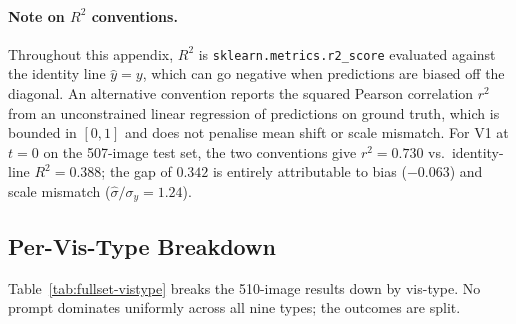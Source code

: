 \paragraph{Note on $R^2$ conventions.}
Throughout this appendix, $R^2$ is \texttt{sklearn.metrics.r2\_score}
evaluated against the identity line $\hat{y} = y$, which can go negative
when predictions are biased off the diagonal. An alternative convention
reports the squared Pearson correlation $r^2$ from an unconstrained
linear regression of predictions on ground truth, which is bounded in
$[0,1]$ and does not penalise mean shift or scale mismatch. For V1 at
$t = 0$ on the 507-image test set, the two conventions give $r^2 = 0.730$
vs.\ identity-line $R^2 = 0.388$; the gap of $0.342$ is entirely
attributable to bias ($-0.063$) and scale mismatch
($\hat\sigma / \sigma_y = 1.24$).

\subsection{Per-Vis-Type Breakdown}
\label{app:fullset-vistype}

Table~\ref{tab:fullset-vistype} breaks the 510-image results down by
vis-type. No prompt dominates uniformly across all nine types; the
outcomes are split.

